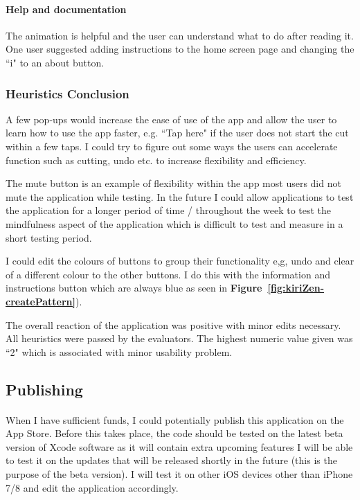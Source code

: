 \documentclass[11pt]{article}
\begin{document}
                \paragraph{Help and documentation} 
                The animation is helpful and the user can understand what to do after reading it. One user suggested adding instructions to the home screen page and changing the ``i" to an about button.
                
                \subsubsection{Heuristics Conclusion}
                A few pop-ups would increase the ease of use of the app and allow the user to learn how to use the app faster, e.g. ``Tap here" if the user does not start the cut within a few taps. I could try to figure out some ways the users can accelerate function such as cutting, undo etc. to increase flexibility and efficiency. 
                
                The mute button is an example of flexibility within the app most users did not mute the application while testing. In the future I could allow applications to test the application for a longer period of time / throughout the week to test the mindfulness aspect of the application which is difficult to test and measure in a short testing period. 
                
                 I could edit the colours of buttons to group their functionality e,g, undo and clear of a different colour to the other buttons. I do this with the information and instructions button which are always blue as seen in \textbf{Figure~\ref{fig:kiriZen-createPattern}}).
                
                The overall reaction of the application was positive with minor edits necessary. All heuristics were passed by the evaluators. The highest numeric value given was ``2" which is associated with minor usability problem.
                
        

    \subsection{Publishing}
        \paragraph{}
        When I have sufficient funds, I could potentially publish this application on the App Store. Before this takes place, the code should be tested on the latest beta version of Xcode software as it will contain extra upcoming features I will be able to test it on the updates that will be released shortly in the future (this is the purpose of the beta version). I will test it on other iOS devices other than iPhone 7/8 and edit the application accordingly.
        
\end{document}
